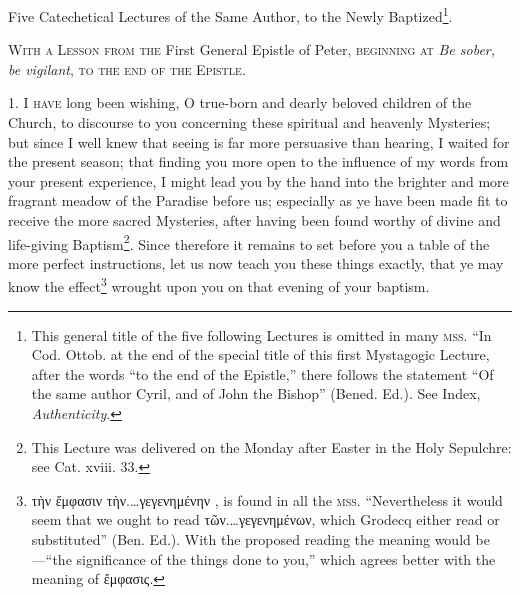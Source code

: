 
Five Catechetical Lectures of the Same Author, to the Newly Baptized\footnote{This general title of the five following Lectures is omitted in many \textsc{mss.} “In Cod. Ottob. at the end of the special title of this first Mystagogic Lecture, after the words “to the end of the Epistle,” there follows the statement “Of the same author Cyril, and of John the Bishop” (Bened. Ed.). See Index, \emph{Authenticity}.}.

\textsc{With a Lesson from the} First General Epistle of Peter\textsc{, beginning at} \emph{Be sober, be vigilant}\textsc{, to the end of the Epistle.}

1. \textsc{I have} long been wishing, O true-born and dearly beloved children of the Church, to discourse to you concerning these spiritual and heavenly Mysteries; but since I well knew that seeing is far more persuasive than hearing, I waited for the present season; that finding you more open to the influence of my words from your present experience, I might lead you by the hand into the brighter and more fragrant meadow of the Paradise before us; especially as ye have been made fit to receive the more sacred Mysteries, after having been found worthy of divine and life-giving Baptism\footnote{This Lecture was delivered on the Monday after Easter in the Holy Sepulchre: see Cat. xviii. 33.}. Since therefore it remains to set before you a table of the more perfect instructions, let us now teach you these things exactly, that ye may know the effect\footnote{\textgreek{τὴν ἔμφασιν τὴν.…γεγενημένην} , is found in all the \textsc{mss.} “Nevertheless it would seem that we ought to read \textgreek{τῶν.…γεγενημένων}, which Grodecq either read or substituted” (Ben. Ed.). With the proposed reading the meaning would be—“the significance of the things done to you,” which agrees better with the meaning of \textgreek{ἔμφασις}.} wrought upon you on that evening of your baptism.

